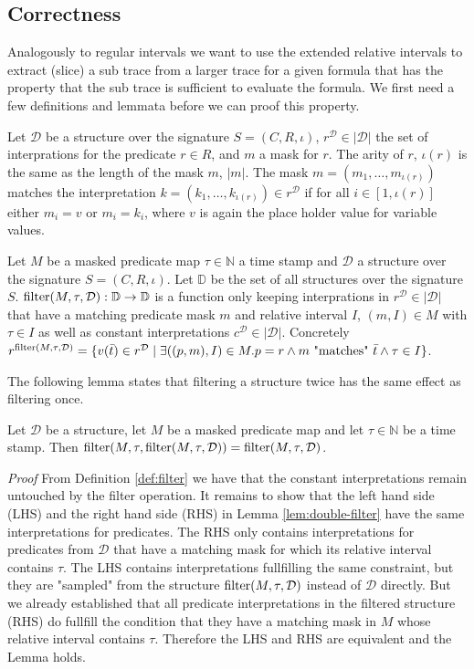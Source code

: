 \subsection{Correctness}
Analogously to regular intervals we want to use the extended relative intervals to extract (slice) a sub trace from a larger trace for a given formula that has the property that the sub trace is sufficient to evaluate the formula.
We first need a few definitions and lemmata before we can proof this property.
\begin{definition}
    \label{def:matching-predicate}
    Let $\mathcal{D}$ be a structure over the signature $S = (C,R,\iota)$, $r^{\mathcal{D}} \in |\mathcal{D}|$ the set of interprations for the predicate $r \in R$, and $m$ a mask for $r$.
    The arity of $r$, $\iota(r)$ is the same as the length of the mask $m$, $|m|$.
    The mask $m = (m_1, \dots, m_{\iota(r)})$ matches the interpretation $k = (k_1, \dots, k_{\iota(r)}) \in r^{\mathcal{D}}$ if for all $i \in [1,\iota(r)]$ either $m_i = v$ or $m_i = k_i$, where $v$ is again the place holder value for variable values.
\end{definition}
\begin{definition}
    \label{def:filter}
    Let $M$ be a masked predicate map $\tau \in \mathbb{N}$ a time stamp and $\mathcal{D}$ a structure over the signature $S = (C,R,\iota)$.
    Let $\mathbb{D}$ be the set of all structures over the signature $S$.
    $\operatorname{filter}(M, \tau,\mathcal{D}) : \mathbb{D} \to \mathbb{D}$ is a function only keeping interprations in $r^{\mathcal{D}} \in |\mathcal{D}|$ that have a matching predicate mask $m$ and relative interval $I$, $(m,I) \in M$ with $\tau \in I$ as well as constant interpretations $c^{\mathcal{D}} \in |\mathcal{D}|$.
    Concretely $r^{\operatorname{filter}(M, \tau, \mathcal{D})} = \{v(\bar{t}) \in r^{\mathcal{D}} \mid \exists ((p,m), I) \in M. p = r \land m \text{ "matches" } \bar{t} \land \tau \in I \}$.
\end{definition}
The following lemma states that filtering a structure twice has the same effect as filtering once.
\begin{lemma}
    \label{lem:double-filter}
    Let $\mathcal{D}$ be a structure, let $M$ be a masked predicate map and let $\tau \in \mathbb{N}$ be a time stamp.
    Then $\operatorname{filter}(M, \tau ,\operatorname{filter}(M, \tau, \mathcal{D})) = \operatorname{filter}(M, \tau, \mathcal{D})$.
\end{lemma}
\textit{Proof} From Definition \ref{def:filter} we have that the constant interpretations remain untouched by the filter operation.
It remains to show that the left hand side (LHS) and the right hand side (RHS) in Lemma \ref{lem:double-filter} have the same interpretations for predicates.
The RHS only contains interpretations for predicates from $\mathcal{D}$ that have a matching mask for which its relative interval contains $\tau$.
The LHS contains interpretations fullfilling the same constraint, but they are "sampled" from the structure $\operatorname{filter}(M,\tau,\mathcal{D})$ instead of $\mathcal{D}$ directly.
But we already established that all predicate interpretations in the filtered structure (RHS) do fullfill the condition that they have a matching mask in $M$ whose relative interval contains $\tau$.
Therefore the LHS and RHS are equivalent and the Lemma holds.


